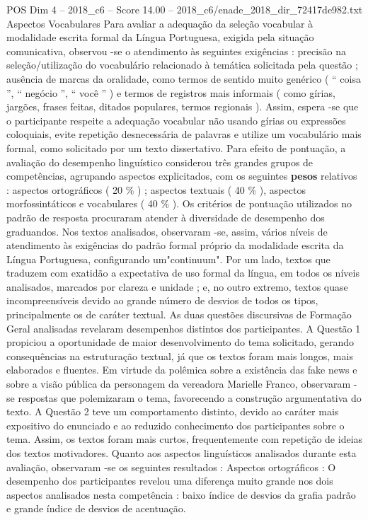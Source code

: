 \begin{textsample}{POS Dim 4 – 2018\_c6 – Score 14.00 – 2018\_c6/enade\_2018\_dir\_72417de982.txt}
Aspectos Vocabulares Para avaliar a adequação da seleção vocabular à modalidade escrita formal da Língua Portuguesa, exigida pela situação comunicativa, observou -se o atendimento às seguintes exigências : precisão na seleção/utilização do vocabulário relacionado à temática solicitada pela questão ; ausência de marcas da oralidade, como termos de sentido muito genérico ( “ coisa ”, “ negócio ”, “ você ” ) e termos de registros mais informais ( como gírias, jargões, frases feitas, ditados populares, termos regionais ).
Assim, espera -se que o participante respeite a adequação vocabular não usando gírias ou expressões coloquiais, evite repetição desnecessária de palavras e utilize um vocabulário mais formal, como solicitado por um texto dissertativo.
Para efeito de pontuação, a avaliação do desempenho linguístico considerou três grandes grupos de competências, agrupando aspectos explicitados, com os seguintes \textbf{pesos} relativos : aspectos ortográficos ( 20 \% ) ; aspectos textuais ( 40 \% ), aspectos morfossintáticos e vocabulares ( 40 \% ).
Os critérios de pontuação utilizados no padrão de resposta procuraram atender à diversidade de desempenho dos graduandos.
Nos textos analisados, observaram -se, assim, vários níveis de atendimento às exigências do padrão formal próprio da modalidade escrita da Língua Portuguesa, configurando um"continuum".
Por um lado, textos que traduzem com exatidão a expectativa de uso formal da língua, em todos os níveis analisados, marcados por clareza e unidade ; e, no outro extremo, textos quase incompreensíveis devido ao grande número de desvios de todos os tipos, principalmente os de caráter textual.
As duas questões discursivas de Formação Geral analisadas revelaram desempenhos distintos dos participantes.
A Questão 1 propiciou a oportunidade de maior desenvolvimento do tema solicitado, gerando consequências na estruturação textual, já que os textos foram mais longos, mais elaborados e fluentes.
Em virtude da polêmica sobre a existência das fake news e sobre a visão pública da personagem da vereadora Marielle Franco, observaram -se respostas que polemizaram o tema, favorecendo a construção argumentativa do texto.
A Questão 2 teve um comportamento distinto, devido ao caráter mais expositivo do enunciado e ao reduzido conhecimento dos participantes sobre o tema.
Assim, os textos foram mais curtos, frequentemente com repetição de ideias dos textos motivadores.
Quanto aos aspectos linguísticos analisados durante esta avaliação, observaram -se os seguintes resultados : Aspectos ortográficos : O desempenho dos participantes revelou uma diferença muito grande nos dois aspectos analisados nesta competência : baixo índice de desvios da grafia padrão e grande índice de desvios de acentuação.

\end{textsample}
